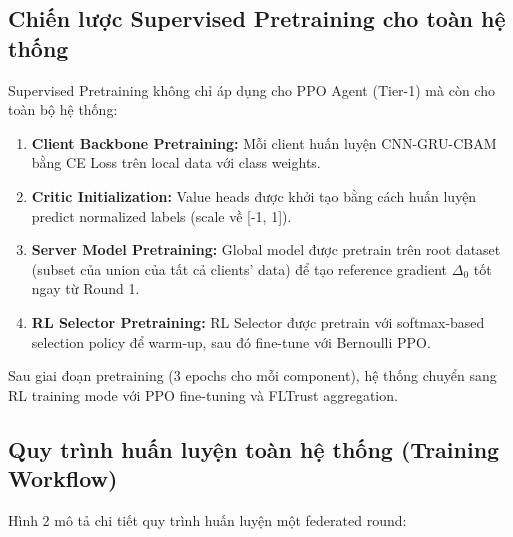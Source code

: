 \documentclass[12pt,a4paper]{article}
\begin{document}
\subsection{Chiến lược Supervised Pretraining cho toàn hệ thống}

Supervised Pretraining không chỉ áp dụng cho PPO Agent (Tier-1) mà còn cho toàn bộ hệ thống:

\begin{enumerate}
    \item \textbf{Client Backbone Pretraining:} Mỗi client huấn luyện CNN-GRU-CBAM bằng CE Loss trên local data với class weights.
    \item \textbf{Critic Initialization:} Value heads được khởi tạo bằng cách huấn luyện predict normalized labels (scale về [-1, 1]).
    \item \textbf{Server Model Pretraining:} Global model được pretrain trên root dataset (subset của union của tất cả clients' data) để tạo reference gradient $\Delta_0$ tốt ngay từ Round 1.
    \item \textbf{RL Selector Pretraining:} RL Selector được pretrain với softmax-based selection policy để warm-up, sau đó fine-tune với Bernoulli PPO.
\end{enumerate}

Sau giai đoạn pretraining (3 epochs cho mỗi component), hệ thống chuyển sang RL training mode với PPO fine-tuning và FLTrust aggregation.

\subsection{Quy trình huấn luyện toàn hệ thống (Training Workflow)}

Hình 2 mô tả chi tiết quy trình huấn luyện một federated round:
\end{document}
